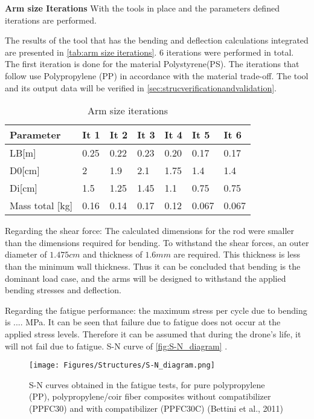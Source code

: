 \textbf{Arm size Iterations} \newline
With the tools in place and the parameters defined iterations are performed.



The results of the tool that has the bending and deflection calculations integrated are presented in \autoref{tab:arm size iterations}. 6 iterations were performed in total. The first iteration is done for the material Polystyrene(PS). The iterations that follow use Polypropylene (PP) in accordance with the material trade-off. The tool and its output data will be verified in \autoref{sec:strucverificationandvalidation}. 

\begin{table}[h]
\centering
\caption{Arm size iterations}
\label{tab:arm size iterations}
\begin{scriptsize}

\begin{tabular}{|l|l|l|l|l|l|l|}
\hline
\textbf{Parameter}  & \textbf{It 1} & \textbf{It 2}              & \textbf{It 3}             & \textbf{It 4}               & \textbf{It 5}               & \textbf{It 6}  \\ \hline
LB{[}m{]}                & 0.25 & 0.22 & 0.23 & 0.20 & 0.17  & 0.17  \\\hline
D0{[}cm{]}               & 2    & 1.9  & 2.1  & 1.75 & 1.4   & 1.4   \\\hline
Di{[}cm{]}               & 1.5  & 1.25 & 1.45 & 1.1  & 0.75  & 0.75  \\\hline
Mass total {[}kg{]} & 0.16 & 0.14 & 0.17 & 0.12 & 0.067 & 0.067 \\ \hline

\end{tabular}%

\end{scriptsize}
\end{table}

Regarding the shear force: The calculated dimensions for the rod were smaller than the dimensions required for bending. To withstand the shear forces, an outer diameter of $1.475cm$ and thickness of $1.6mm$ are required. This thickness is less than the minimum wall thickness. Thus it can be concluded that bending is the dominant load case, and the arms will be designed to withstand the applied bending stresses and deflection.

Regarding the fatigue performance: the maximum stress per cycle due to bending is ....  MPa. It can be seen that failure due to fatigue does not occur at the applied stress levels. Therefore it can be assumed that during the drone's life, it will not fail due to fatigue. S-N curve of \autoref{fig:S-N_diagram} \cite{fatigue_paper}.
\begin{figure}[H]
    \centering
    \texttt{[image: Figures/Structures/S-N\_diagram.png]}
    \caption{S-N curves obtained in the fatigue tests, for pure polypropylene (PP), polypropylene/coir fiber composites without compatibilizer (PPFC30) and with compatibilizer (PPFC30C)
(Bettini et al., 2011)}
    \label{fig:S-N_diagram}
\end{figure}


